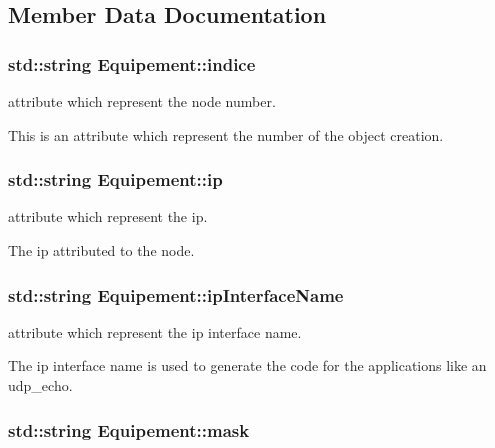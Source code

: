 \subsection{Member Data Documentation}
\hypertarget{class_equipement_d5124abeb4730c781cf45e7d538ebbc2}{
\subsubsection[{indice}]{\setlength{\rightskip}{0pt plus 5cm}std::string {\bf Equipement::indice}}}
\label{class_equipement_d5124abeb4730c781cf45e7d538ebbc2}


attribute which represent the node number. 

This is an attribute which represent the number of the object creation. \hypertarget{class_equipement_0b1a1b3183ff2e26d5e86adcaa1a151d}{
\subsubsection[{ip}]{\setlength{\rightskip}{0pt plus 5cm}std::string {\bf Equipement::ip}}}
\label{class_equipement_0b1a1b3183ff2e26d5e86adcaa1a151d}


attribute which represent the ip. 

The ip attributed to the node. \hypertarget{class_equipement_3e3703936280f99d55619e7b86810f3b}{
\subsubsection[{ipInterfaceName}]{\setlength{\rightskip}{0pt plus 5cm}std::string {\bf Equipement::ipInterfaceName}}}
\label{class_equipement_3e3703936280f99d55619e7b86810f3b}


attribute which represent the ip interface name. 

The ip interface name is used to generate the code for the applications like an udp\_\-echo. \hypertarget{class_equipement_bc9e4c10eacad003427f4812890c7d52}{
\subsubsection[{mask}]{\setlength{\rightskip}{0pt plus 5cm}std::string {\bf Equipement::mask}}}
\label{class_equipement_bc9e4c10eacad003427f4812890c7d52}


